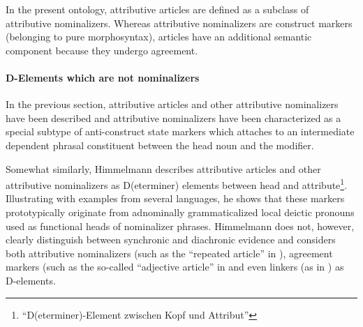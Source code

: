 In the present ontology, attributive articles are defined as a subclass of attributive nominalizers. Whereas attributive nominalizers are construct markers (belonging to pure morphosyntax), articles have an additional semantic component because they undergo agreement. %

\paragraph*{D-Elements which are not nominalizers}
In the previous section, attributive articles and other attributive nominalizers have been described and attributive nominalizers have been characterized as a special subtype of anti\hyp{}construct state markers which attaches to an intermediate dependent phrasal constituent between the head noun and the modifier.

Somewhat similarly, Himmelmann \citeyear{himmelmann1997} describes attributive articles and other attributive nominalizers as D(eterminer) elements between head and attribute\footnote{“D(eterminer)-Element zwischen Kopf und Attribut”}. Illustrating  with examples from several languages, he shows that these markers prototypically originate from adnominally grammaticalized local deictic pronouns used as functional heads of nominalizer phrases. Himmelmann does not, however, clearly distinguish between synchronic and diachronic evidence and considers both attributive nominalizers (such as the “repeated article” in ), agreement markers (such as the so-called “adjective article” in  and even linkers (as in ) as D-elements.

